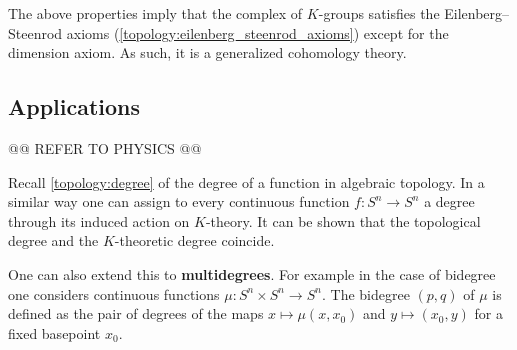 {    \begin{remark}
        The above properties imply that the complex of $K$-groups satisfies the Eilenberg--Steenrod axioms (\cref{topology:eilenberg_steenrod_axioms}) except for the dimension axiom. As such, it is a generalized cohomology theory.
    \end{remark}

\subsection{Applications}

    @@ REFER TO PHYSICS @@

    \begin{property}[Degree]
        Recall \cref{topology:degree} of the degree of a function in algebraic topology. In a similar way one can assign to every continuous function $f:S^n\rightarrow S^n$ a degree through its induced action on $K$-theory. It can be shown that the topological degree and the $K$-theoretic degree coincide.

        One can also extend this to \textbf{multidegrees}. For example in the case of bidegree one considers continuous functions $\mu:S^n\times S^n\rightarrow S^n$. The bidegree $(p,q)$ of $\mu$ is defined as the pair of degrees of the maps $x\mapsto\mu(x,x_0)$ and $y\mapsto(x_0,y)$ for a fixed basepoint $x_0$.
    \end{property}


}
